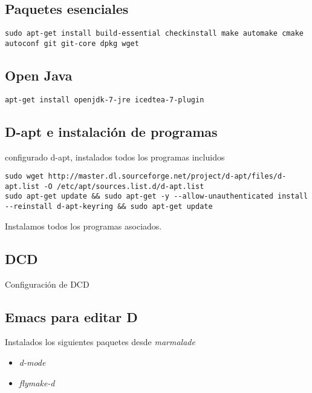 \documentclass[12pt,spanish,]{article}
\providecommand{\tightlist}{%
  \setlength{\itemsep}{0pt}\setlength{\parskip}{0pt}}
\begin{document}
\subsection{Paquetes esenciales}\label{paquetes-esenciales}

\begin{verbatim}
sudo apt-get install build-essential checkinstall make automake cmake autoconf git git-core dpkg wget
\end{verbatim}

\subsection{Open Java}\label{open-java}

\begin{verbatim}
apt-get install openjdk-7-jre icedtea-7-plugin
\end{verbatim}

\subsection{D-apt e instalación de
programas}\label{d-apt-e-instalaciuxf3n-de-programas}

configurado d-apt, instalados todos los programas incluidos

\begin{verbatim}
sudo wget http://master.dl.sourceforge.net/project/d-apt/files/d-apt.list -O /etc/apt/sources.list.d/d-apt.list
sudo apt-get update && sudo apt-get -y --allow-unauthenticated install --reinstall d-apt-keyring && sudo apt-get update
\end{verbatim}

Instalamos todos los programas asociados.

\subsection{DCD}\label{dcd}

Configuración de DCD

\subsection{Emacs para editar D}\label{emacs-para-editar-d}

Instalados los siguientes paquetes desde \emph{marmalade}

\begin{itemize}
\tightlist
\item
  \emph{d-mode}
\item
  \emph{flymake-d}
\end{itemize}
\end{document}
